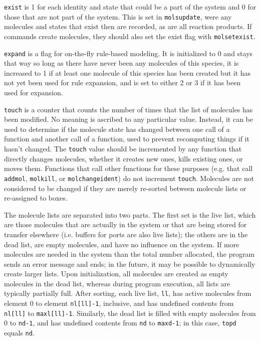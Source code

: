 \documentclass {scrbook}
\newcommand {\ttt} {\texttt}
\begin{document}
\ttt{exist} is 1 for each identity and state that could be a part of the system and 0 for those that are not part of the system. This is set in \ttt{molsupdate}, were any molecules and states that exist then are recorded, as are all reaction products. If commands create molecules, they should also set the exist flag with \ttt{molsetexist}.

\ttt{expand} is a flag for on-the-fly rule-based modeling. It is initialized to 0 and stays that way so long as there have never been any molecules of this species, it is increased to 1 if at least one molecule of this species has been created but it has not yet been used for rule expansion, and is set to either 2 or 3 if it has been used for expansion.

\ttt{touch} is a counter that counts the number of times that the list of molecules has been modified. No meaning is ascribed to any particular value. Instead, it can be used to determine if the molecule state has changed between one call of a function and another call of a function, used to prevent recomputing things if it hasn't changed. The \ttt{touch} value should be incremented by any function that directly changes molecules, whether it creates new ones, kills existing ones, or moves them. Functions that call other functions for these purposes (e.g. that call \ttt{addmol}, \ttt{molkill}, or \ttt{molchangeident}) do not increment \ttt{touch}. Molecules are not considered to be changed if they are merely re-sorted between molecule lists or re-assigned to boxes.

The molecule lists are separated into two parts. The first set is the live list, which are those molecules that are actually in the system or that are being stored for transfer elsewhere (i.e. buffers for ports are also live lists); the others are in the dead list, are empty molecules, and have no influence on the system. If more molecules are needed in the system than the total number allocated, the program sends an error message and ends; in the future, it may be possible to dynamically create larger lists. Upon initialization, all molecules are created as empty molecules in the dead list, whereas during program execution, all lists are typically partially full. After sorting, each live list, \ttt{ll}, has active molecules from element 0 to element \ttt{nl[ll]-1}, inclusive, and has undefined contents from \ttt{nl[ll]} to \ttt{maxl[ll]-1}. Similarly, the dead list is filled with empty molecules from 0 to \ttt{nd-1}, and has undefined contents from \ttt{nd} to \ttt{maxd-1}; in this case, \ttt{topd} equals \ttt{nd}.
\end{document}
